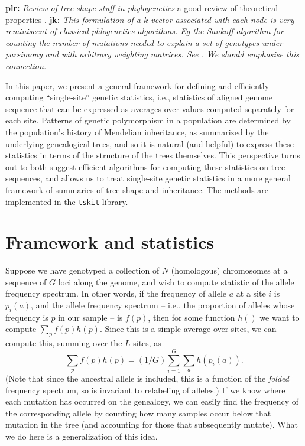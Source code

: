 \documentclass{article}
\newcommand{\tskit}{{\texttt{tskit}}}
\newcommand{\plr}[1]{{\color{blue}\textbf{plr:} \it #1}}
\newcommand{\jk}[1]{{\color{red}\textbf{jk:} \it #1}}
\begin{document}
\plr{Review of tree shape stuff in phylogenetics}
a good review of theoretical properties \citet{semple2003phylogenetics}.
\jk{This formulation of a $k$-vector associated with each node is very
reminiscent of classical phlogenetics algorithms. Eg the Sankoff algorithm
for counting the number of mutations needed to explain a set of genotypes
under parsimony and with arbitrary weighting matrices. See
\citep[pg.13]{felsenstein2004inferring}. We should emphasise this connection.}

In this paper, we present a general framework for defining and efficiently computing
``single-site'' genetic statistics,
i.e., statistics of aligned genome sequence that can be expressed as averages over values computed
separately for each site.
Patterns of genetic polymorphism in a population
are determined by the population's history of Mendelian inheritance,
as summarized by the underlying genealogical trees,
and so it is natural (and helpful) to express these statistics
in terms of the structure of the trees themselves.
This perspective turns out to both suggest efficient algorithms
for computing these statistics on tree sequences,
and allows us to treat single-site genetic statistics in a more general framework
of summaries of tree shape and inheritance.
The methods are implemented in the \tskit{} library.

\section*{Framework and statistics}


Suppose we have genotyped a collection of $N$ (homologous) chromosomes
at a sequence of $G$ loci along the genome,
and wish to compute statistic of the allele frequency spectrum.
In other words, if the frequency of allele $a$ at a site $i$ is $p_i(a)$,
and the allele frequency spectrum
-- i.e., the proportion of alleles whose frequency is $p$ in our sample -- is $f(p)$,
then for some function $h()$ we want to compute $\sum_p f(p) h(p)$.
Since this is a simple average over sites,
we can compute this, summing over the $L$ sites, as
$$\sum_p f(p) h(p) = (1/G) \sum_{i=1}^G \sum_a h(p_i(a)).$$
(Note that since the ancestral allele is included, this is a function of the 
\emph{folded} frequency spectrum, so is invariant to relabeling of alleles.)
If we know where each mutation has occurred on the genealogy,
we can easily find the frequency of the corresponding allele by counting how many samples
occur below that mutation in the tree (and accounting for those that subsequently mutate).
What we do here is a generalization of this idea.
\end{document}
